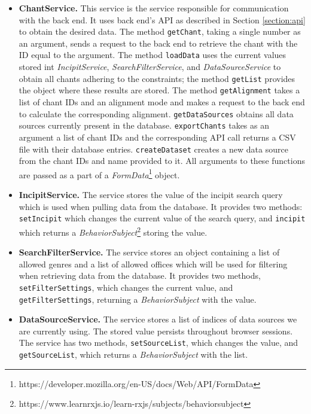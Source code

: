 \begin{itemize}

\item\textbf{ChantService.} This service is the service responsible for communication with the back end. It uses back end's API as described in Section \ref{section:api} to
obtain the desired data. The method \verb|getChant|, taking a single number as an argument, sends a request to the back end to retrieve the chant with 
the ID equal to the argument. The method \verb|loadData| uses the current values stored int \emph{IncipitService}, \emph{SearchFilterService}, and
\emph{DataSourceService} to obtain all chants adhering to the constraints; the method \verb|getList| provides the object where these results are stored.
The method \verb|getAlignment| takes a list of chant IDs and an alignment mode and makes a request to the back end to calculate the corresponding alignment.
\verb|getDataSources| obtains all data sources currently present in the database. \verb|exportChants| takes as an argument a list of chant IDs and the 
corresponding API call returns a CSV file with their database entries. \verb|createDataset| creates a new data source from the chant IDs and name provided
to it. All arguments to these functions are passed as a part of a \emph{FormData}\footnote{https://developer.mozilla.org/en-US/docs/Web/API/FormData}
object.

\item\textbf{IncipitService.} The service stores the value of the incipit search query which is used when pulling data from the database. It provides two methods:
\verb|setIncipit| which changes the current value of the search query, and \verb|incipit| which returns a \emph{BehaviorSubject}\footnote{https://www.learnrxjs.io/learn-rxjs/subjects/behaviorsubject}
storing the value.

\item\textbf{SearchFilterService.} The service stores an object containing a list of allowed genres and a list of allowed offices which will be used for filtering
when retrieving data from the database. It provides two methods, \verb|setFilterSettings|, which changes the current value, and \verb|getFilterSettings|, returning
a \emph{BehaviorSubject} with the value.

\item\textbf{DataSourceService.} The service stores a list of indices of data sources we are currently using. The stored value persists throughout browser sessions.
The service has two methods, \verb|setSourceList|, which changes the value, and \verb|getSourceList|, which returns a \emph{BehaviorSubject} with the list.


\end{itemize}
